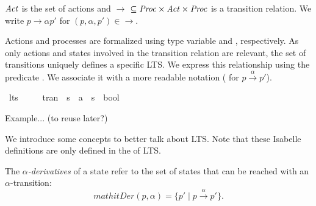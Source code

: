\begin{isabellebody}
\begin{isamarkuptext}
$\mathit{Act}$ is the set of actions and $\rightarrow$ $\subseteq \mathit{Proc} \times \mathit{Act} \times \mathit{Proc}$ is a transition relation.
We write $p \rightarrow{\alpha} p'$ for $(p, \alpha, p')\in \rightarrow$.%
\end{isamarkuptext}\isamarkuptrue%
%
\begin{isamarkuptext}%
Actions and processes are formalized using type variable  and , respectively. As only actions and states involved in the transition relation are relevant, 
the set of transitions uniquely defines a specific LTS. We express this relationship using the predicate . We associate it with a more readable notation ( for $p \xrightarrow{\alpha} p'$).%
\end{isamarkuptext}\isamarkuptrue%
\isamarkupfalse%
\ lts\ {\isacharequal}{\kern0pt}\ \isanewline
\ \ \ tran\ {\isacharcolon}{\kern0pt}{\isacharcolon}{\kern0pt}\ {\isacartoucheopen}{\isacharprime}{\kern0pt}s\ {\isasymRightarrow}\ {\isacharprime}{\kern0pt}a\ {\isasymRightarrow}\ {\isacharprime}{\kern0pt}s\ {\isasymRightarrow}\ bool{\isacartoucheclose}\ \isanewline
\ \ \ \ {\isacharparenleft}{\kern0pt}{\isachardoublequoteopen}{\isacharunderscore}{\kern0pt}\ {\isasymmapsto}{\isacharunderscore}{\kern0pt}\ {\isacharunderscore}{\kern0pt}{\isachardoublequoteclose}\ {\isacharbrackleft}{\kern0pt}{}{}{\isacharcomma}{\kern0pt}\ {}{}{\isacharcomma}{\kern0pt}\ {}{}{\isacharbrackright}{\kern0pt}\ {}{}{\isacharparenright}{\kern0pt}\isanewline
{}%
\begin{isamarkuptext}%
Example... (to reuse later?)%
\end{isamarkuptext}\isamarkuptrue%
%
\begin{isamarkuptext}%
We introduce some concepts to better talk about LTS. Note that these Isabelle definitions are only defined in the  of LTS.%
\end{isamarkuptext}\isamarkuptrue%
%
\isadelimdocument
%
\endisadelimdocument
%
\isatagdocument
%
\isamarkuptrue%
%
\endisatagdocument
{\isafolddocument}%
%
\isadelimdocument
%
\endisadelimdocument
%
\begin{isamarkuptext}%
The \textit{$\alpha$-derivatives} of a state refer to the set of states that can be reached with an $\alpha$-transition:
$$mathit{Der} (p, \alpha) = \{ p' \mid p \xrightarrow{\alpha} p' \}.$$%

\end{isamarkuptext}
\end{isabellebody}
